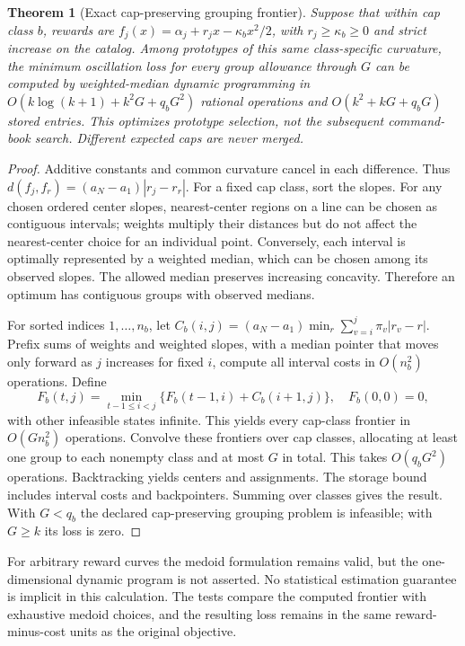 \documentclass[11pt,letterpaper]{article}
\newtheorem{theorem}{Theorem}[section]
\theoremstyle{definition}\newtheorem{remark}[theorem]{Remark}
\begin{document}
\begin{theorem}[Exact cap-preserving grouping frontier]\label{thm:grouping59}
Suppose that within cap class $b$, rewards are $f_j(x)=\alpha_j+r_jx-\kappa_b x^2/2$, with $r_j\geq\kappa_b\geq0$ and strict increase on the catalog. Among prototypes of this same class-specific curvature, the minimum oscillation loss for every group allowance through $G$ can be computed by weighted-median dynamic programming in
$O(k\log(k+1)+k^2G+q_bG^2)$ rational operations and $O(k^2+kG+q_bG)$ stored entries. This optimizes prototype selection, not the subsequent command-book search. Different expected caps are never merged.
\end{theorem}
\begin{proof}
Additive constants and common curvature cancel in each difference. Thus $d(f_j,f_r)=(a_N-a_1)|r_j-r_r|$. For a fixed cap class, sort the slopes. For any chosen ordered center slopes, nearest-center regions on a line can be chosen as contiguous intervals; weights multiply their distances but do not affect the nearest-center choice for an individual point. Conversely, each interval is optimally represented by a weighted median, which can be chosen among its observed slopes. The allowed median preserves increasing concavity. Therefore an optimum has contiguous groups with observed medians.

For sorted indices $1,\ldots,n_b$, let
$C_b(i,j)=(a_N-a_1)\min_r\sum_{v=i}^j\pi_v|r_v-r|$.
Prefix sums of weights and weighted slopes, with a median pointer that moves only forward as $j$ increases for fixed $i$, compute all interval costs in $O(n_b^2)$ operations. Define
\[
 F_b(t,j)=\min_{t-1\leq i<j}\{F_b(t-1,i)+C_b(i+1,j)\},
 \quad F_b(0,0)=0,
\]
with other infeasible states infinite. This yields every cap-class frontier in $O(Gn_b^2)$ operations. Convolve these frontiers over cap classes, allocating at least one group to each nonempty class and at most $G$ in total. This takes $O(q_bG^2)$ operations. Backtracking yields centers and assignments. The storage bound includes interval costs and backpointers. Summing over classes gives the result. With $G<q_b$ the declared cap-preserving grouping problem is infeasible; with $G\geq k$ its loss is zero.
\end{proof}

For arbitrary reward curves the medoid formulation remains valid, but the one-dimensional dynamic program is not asserted. No statistical estimation guarantee is implicit in this calculation. The tests compare the computed frontier with exhaustive medoid choices, and the resulting loss remains in the same reward-minus-cost units as the original objective.
\end{document}
